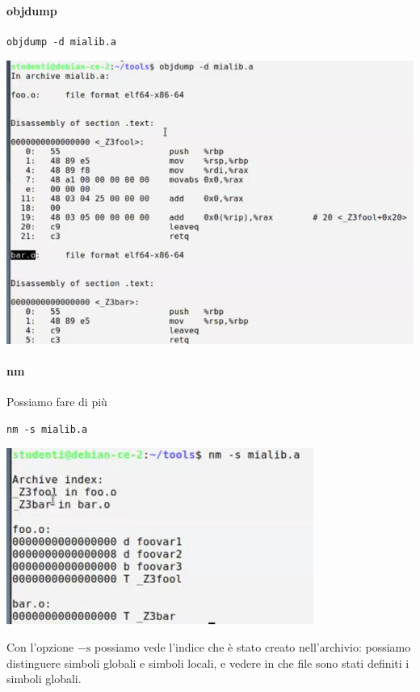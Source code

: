 \documentclass[11pt]{report}
\theoremstyle{definition}
\begin{document}
\begin{multicols}{2}
\paragraph{objdump}
\begin{verbatim}
objdump -d mialib.a
\end{verbatim}
\begin{center}
\includegraphics[scale=0.65]{img/62.png}
\end{center}
\end{multicols}
\paragraph{nm} Possiamo fare di più
\begin{verbatim}
nm -s mialib.a
\end{verbatim}
\begin{center}
\includegraphics{img/63.png}
\end{center}
Con l'opzione $-\text{s}$ possiamo vede l'indice che è stato creato nell'archivio: possiamo distinguere simboli globali e simboli locali, e vedere in che file sono stati definiti i simboli globali.
\end{document}
